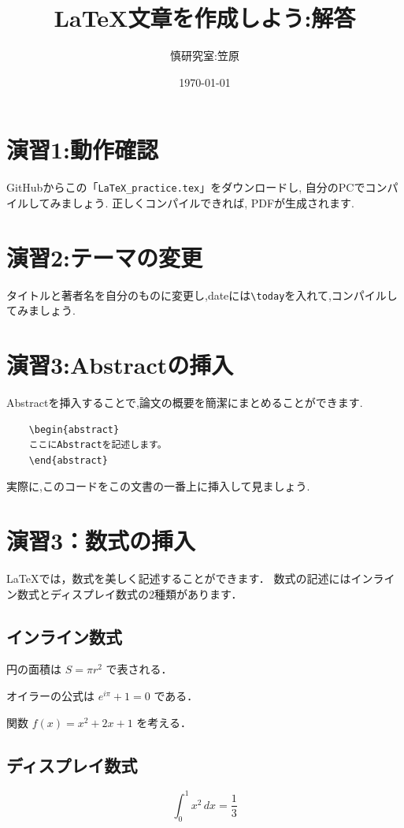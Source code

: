 \documentclass[a4paper,twocolumn]{jsarticle}
\title{
LaTeX文章を作成しよう:解答
}
\author{慎研究室:笠原}
\date{\today}
\begin{document}
\maketitle  %
\begin{abstract}%
\lipsum[1]
\end{abstract}
\section*{演習1:動作確認}
GitHubからこの「\texttt{LaTeX\_practice.tex}」をダウンロードし,
自分のPCでコンパイルしてみましょう.
正しくコンパイルできれば, PDFが生成されます.
\section*{演習2:テーマの変更}
タイトルと著者名を自分のものに変更し,dateには\verb|\today|を入れて,コンパイルしてみましょう.\\
\section*{演習3:Abstractの挿入}
Abstractを挿入することで,論文の概要を簡潔にまとめることができます.
\begin{verbatim}
    \begin{abstract}
    ここにAbstractを記述します。
    \end{abstract}
\end{verbatim}
実際に,このコードをこの文書の一番上に挿入して見ましょう.
\section*{演習3：数式の挿入}
LaTeXでは，数式を美しく記述することができます．
数式の記述にはインライン数式とディスプレイ数式の2種類があります．
\subsection*{インライン数式}
円の面積は $S=\pi r^2$ で表される．

オイラーの公式は $e^{i\pi}+1=0$ である．

関数 $f(x)=x^2+2x+1$ を考える．
\subsection*{ディスプレイ数式}
\begin{equation}
\int_{0}^{1} x^2\,dx=\frac{1}{3}
\label{eq:integral}
\end{equation}
\end{document}
